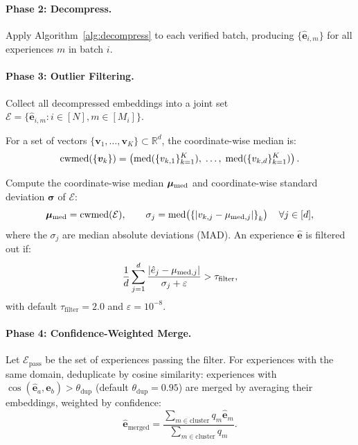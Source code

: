 \paragraph{Phase 2: Decompress.}
Apply Algorithm~\ref{alg:decompress} to each verified batch, producing
$\{\hat{\bm{e}}_{i,m}\}$ for all experiences $m$ in batch $i$.

\paragraph{Phase 3: Outlier Filtering.}
Collect all decompressed embeddings into a joint set
$\mathcal{E} = \{\hat{\bm{e}}_{i,m} : i \in [N], m \in [M_i]\}$.

\begin{definition}
\label{def:cwmed}
For a set of vectors $\{\bm{v}_1, \ldots, \bm{v}_K\} \subset \mathbb{R}^d$,
the coordinate-wise median is:
\begin{equation}
    \text{cwmed}(\{\bm{v}_k\}) = \left(\operatorname{med}(\{v_{k,1}\}_{k=1}^K), \;\ldots,\;
    \operatorname{med}(\{v_{k,d}\}_{k=1}^K)\right).
\end{equation}
\end{definition}

Compute the coordinate-wise median $\bm{\mu}_{\operatorname{med}}$ and coordinate-wise
standard deviation $\bm{\sigma}$ of $\mathcal{E}$:
\begin{equation}
    \bm{\mu}_{\operatorname{med}} = \text{cwmed}(\mathcal{E}),
    \qquad
    \sigma_j = \operatorname{med}\!\left(\left\{|v_{k,j} - \mu_{\operatorname{med},j}|\right\}_k\right)
    \quad \forall j \in [d],
    \label{eq:mad}
\end{equation}
where the $\sigma_j$ are median absolute deviations (MAD). An experience
$\hat{\bm{e}}$ is filtered out if:
\begin{equation}
    \frac{1}{d}\sum_{j=1}^{d} \frac{|\hat{e}_j - \mu_{\operatorname{med},j}|}{\sigma_j + \varepsilon} > \tau_{\text{filter}},
    \label{eq:filter}
\end{equation}
with default $\tau_{\text{filter}} = 2.0$ and $\varepsilon = 10^{-8}$.

\paragraph{Phase 4: Confidence-Weighted Merge.}
Let $\mathcal{E}_{\text{pass}}$ be the set of experiences passing the filter.
For experiences with the same domain, deduplicate by cosine similarity:
experiences with $\cos(\hat{\bm{e}}_a, \hat{\bm{e}}_b) > \theta_{\text{dup}}$
(default $\theta_{\text{dup}} = 0.95$) are merged by averaging their
embeddings, weighted by confidence:
\begin{equation}
    \hat{\bm{e}}_{\text{merged}} = \frac{\sum_{m \in \text{cluster}} q_m \hat{\bm{e}}_m}{\sum_{m \in \text{cluster}} q_m}.
    \label{eq:weighted-merge}
\end{equation}

